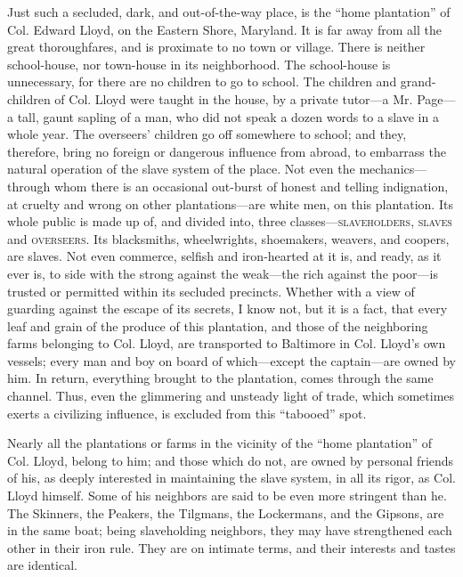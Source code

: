 Just such a secluded, dark, and out-of-the-way place, is the ``home
plantation'' of Col. Edward Lloyd, on the Eastern Shore, Maryland. It is
far away from all the great thoroughfares, and is proximate to no town
or village. There is neither school-house, nor town-house in its
neighborhood. The school-house is unnecessary, for there are no children
to go to school. The children and grand-children of Col. Lloyd were
taught in the house, by a private tutor---a Mr. Page---a tall, gaunt
sapling of a man, who did not speak a dozen words to a slave in a whole
year. The overseers' children go off somewhere to school; and they,
therefore, bring no foreign or dangerous influence from abroad, to
embarrass the natural operation of the slave system of the place. Not
even the mechanics---through whom there is an occasional out-burst of
honest and telling indignation, at cruelty and wrong on other
plantations---are white men, on this plantation. Its whole public is
made up of, and divided into, three classes---\textsc{slaveholders},
\textsc{slaves} and \textsc{overseers}. Its blacksmiths, wheelwrights,
shoemakers, weavers, and coopers, are slaves. Not even commerce, selfish
and iron-hearted at it is, and ready, as it ever is, to side with the
strong against the {\protect\hypertarget{63}{}{}}weak---the rich against
the poor---is trusted or permitted within its secluded precincts.
Whether with a view of guarding against the escape of its secrets, I
know not, but it is a fact, that every leaf and grain of the produce of
this plantation, and those of the neighboring farms belonging to Col.
Lloyd, are transported to Baltimore in Col. Lloyd's own vessels; every
man and boy on board of which---except the captain---are owned by him.
In return, everything brought to the plantation, comes through the same
channel. Thus, even the glimmering and unsteady light of trade, which
sometimes exerts a civilizing influence, is excluded from this
``tabooed'' spot.

Nearly all the plantations or farms in the vicinity of the ``home
plantation'' of Col. Lloyd, belong to him; and those which do not, are
owned by personal friends of his, as deeply interested in maintaining
the slave system, in all its rigor, as Col. Lloyd himself. Some of his
neighbors are said to be even more stringent than he. The Skinners, the
Peakers, the Tilgmans, the Lockermans, and the Gipsons, are in the same
boat; being slaveholding neighbors, they may have strengthened each
other in their iron rule. They are on intimate terms, and their
interests and tastes are identical.

